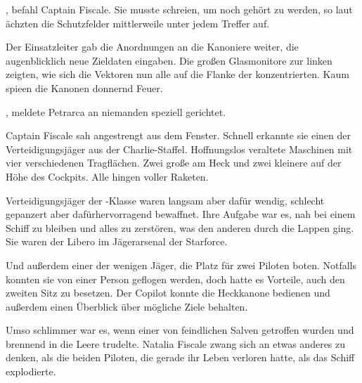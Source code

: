 , befahl Captain Fiscale. Sie musste schreien, um noch gehört zu werden, so laut ächzten die Schutzfelder mittlerweile unter jedem Treffer auf. 

\par

Der Einsatzleiter gab die Anordnungen an die Kanoniere weiter, die augenblicklich neue Zieldaten eingaben. Die großen Glasmonitore zur linken zeigten, wie sich die Vektoren nun alle auf die Flanke der  konzentrierten. Kaum spieen die Kanonen donnernd Feuer.

\par

, meldete Petrarca an niemanden speziell gerichtet. 

\par

Captain Fiscale sah angestrengt aus dem Fenster. Schnell erkannte sie einen der Verteidigungsjäger aus der Charlie-Staffel. Hoffnungslos veraltete Maschinen mit vier verschiedenen Tragflächen. Zwei große am Heck und zwei kleinere auf der Höhe des Cockpits. Alle hingen voller Raketen.

\par

Verteidigungsjäger der -Klasse waren langsam aber dafür wendig, schlecht gepanzert aber dafürhervorragend bewaffnet. Ihre Aufgabe war es, nah bei einem Schiff zu bleiben und alles zu zerstören, was den anderen durch die Lappen ging. Sie waren der Libero im Jägerarsenal der Starforce.

\par

Und außerdem einer der wenigen Jäger, die Platz für zwei Piloten boten. Notfalls konnten sie von einer Person geflogen werden, doch hatte es Vorteile, auch den zweiten Sitz zu besetzen. Der Copilot konnte die Heckkanone bedienen und außerdem einen Überblick über mögliche Ziele behalten.

\par

Umso schlimmer war es, wenn einer von feindlichen Salven getroffen wurden und brennend in die Leere trudelte. Natalia Fiscale zwang sich an etwas anderes zu denken, als die beiden Piloten, die gerade ihr Leben verloren hatte, als das Schiff explodierte.

